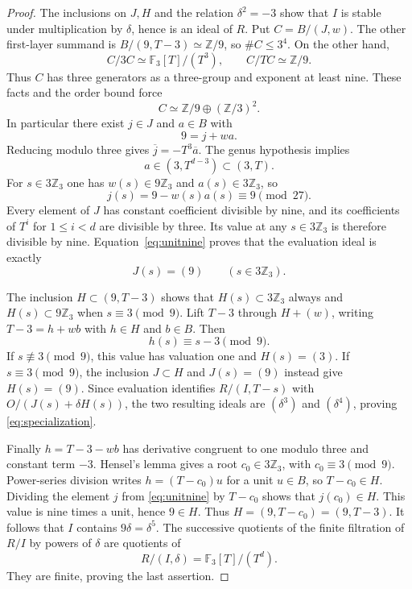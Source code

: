 \documentclass[11pt]{article}
\theoremstyle{remark}\newtheorem{remark}[theorem]{Remark}
\newcommand{\Z}{\mathbb Z}\newcommand{\Q}{\mathbb Q}\newcommand{\F}{\mathbb F}
\begin{document}
\begin{proof}
The inclusions on $J,H$ and the relation $\delta^2=-3$ show that $I$ is stable under multiplication by $\delta$, hence is an ideal of $R$.
Put $C=B/(J,w)$.
The other first-layer summand is $B/(9,T-3)\simeq\Z/9$, so $\#C\leq3^4$.
On the other hand,
\[
 C/3C\simeq\F_3[T]/(T^3),\qquad C/TC\simeq\Z/9.
\]
Thus $C$ has three generators as a three-group and exponent at least nine.
These facts and the order bound force
\[
 C\simeq\Z/9\oplus(\Z/3)^2.
\]
In particular there exist $j\in J$ and $a\in B$ with
\[
 9=j+wa.
\]
Reducing modulo three gives $\overline j=-T^3\overline a$.
The genus hypothesis implies
\[
 a\in(3,T^{d-3})\subset(3,T).
\]
For $s\in3\Z_3$ one has $w(s)\in9\Z_3$ and $a(s)\in3\Z_3$, so
\begin{equation}
 j(s)=9-w(s)a(s)\equiv9\pmod{27}.
 \label{eq:unitnine}
\end{equation}
Every element of $J$ has constant coefficient divisible by nine, and its coefficients of $T^i$ for $1\leq i<d$ are divisible by three.
Its value at any $s\in3\Z_3$ is therefore divisible by nine.
Equation~\eqref{eq:unitnine} proves that the evaluation ideal is exactly
\[
 J(s)=(9)\qquad(s\in3\Z_3).
\]

The inclusion $H\subset(9,T-3)$ shows that $H(s)\subset3\Z_3$ always and $H(s)\subset9\Z_3$ when $s\equiv3\pmod9$.
Lift $T-3$ through $H+(w)$, writing $T-3=h+wb$ with $h\in H$ and $b\in B$.
Then
\[
 h(s)\equiv s-3\pmod9.
\]
If $s\not\equiv3\pmod9$, this value has valuation one and $H(s)=(3)$.
If $s\equiv3\pmod9$, the inclusion $J\subset H$ and $J(s)=(9)$ instead give $H(s)=(9)$.
Since evaluation identifies $R/(I,T-s)$ with $O/(J(s)+\delta H(s))$, the two resulting ideals are $(\delta^3)$ and $(\delta^4)$, proving \eqref{eq:specialization}.

Finally $h=T-3-wb$ has derivative congruent to one modulo three and constant term $-3$.
Hensel's lemma gives a root $c_0\in3\Z_3$, with $c_0\equiv3\pmod9$.
Power-series division writes $h=(T-c_0)u$ for a unit $u\in B$, so $T-c_0\in H$.
Dividing the element $j$ from \eqref{eq:unitnine} by $T-c_0$ shows that $j(c_0)\in H$.
This value is nine times a unit, hence $9\in H$.
Thus $H=(9,T-c_0)=(9,T-3)$.
It follows that $I$ contains $9\delta=\delta^5$.
The successive quotients of the finite filtration of $R/I$ by powers of $\delta$ are quotients of
\[
 R/(I,\delta)=\F_3[T]/(T^d).
\]
They are finite, proving the last assertion.
\end{proof}
\end{document}
